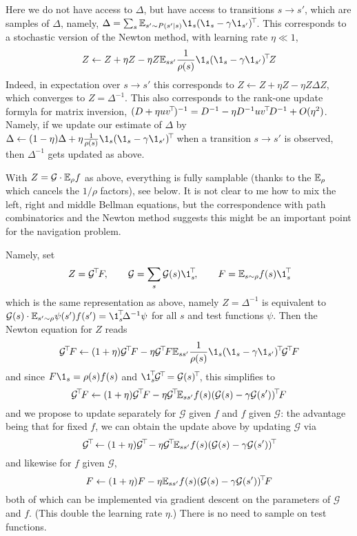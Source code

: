 \documentclass[11pt,a4paper]{article}
\newcommand{\green}{\mathcal{G}}
\begin{document}
Here we do not have access to $\Delta$, but have access to transitions
$s\to s'$, which are samples of
$\Delta$, namely, $\Delta=\sum_s\E_{s'\sim P(s'|s)} \1_s\transp{(\1_s-\gamma
\1_{s'})}$. This corresponds to a stochastic version of the Newton
method, with learning rate $\eta\ll 1$,
\begin{equation}
Z\gets Z+\eta Z-\eta Z \E_{ss'} \frac{1}{\rho(s)}\1_s\transp{(\1_s-\gamma \1_{s'})} Z
\end{equation}
Indeed, in expectation over $s\to s'$ this corresponds to $Z\gets Z+\eta
Z-\eta Z \Delta Z$, which converges to $Z=\Delta^{-1}$. This
also corresponds to the rank-one update formyla for matrix inversion,
$(D+\eta uv^{\!\top}\!)^{-1}=D^{-1}-\eta
D^{-1}uv^{\!\top}\!D^{-1}+O(\eta^2)$. Namely,
if we update our estimate of $\Delta$ by
$\Delta\gets (1-\eta)\Delta+\eta \frac{1}{\rho(s)} \1_s\transp{(\1_s-\gamma
\1_{s'})}$ when a transition $s\to s'$ is observed, then
$\Delta^{-1}$ gets updated as above.

With $Z=\green\cdot \E_{\rho} f$ as above, everything is fully samplable
(thanks to the $\mathbb{E}_\rho$ which cancels the $1/\rho$ factors), see below.
It is not clear to me how to mix the left, right and middle Bellman
equations, but the correspondence with path combinatorics and the Newton
method suggests this
might be an important point for the navigation problem.

Namely, set
\begin{equation}
Z=\transp{\green}F, \qquad \green=\sum_s \green(s)\transp{\1_s},\qquad F=\E_{s\sim
\rho}
f(s)\transp{\1_s}
\end{equation}
which is the same representation as above, namely $Z=\Delta^{-1}$ is
equivalent to $\green(s)\cdot \E_{s'\sim
\rho} \psi(s')f(s')=\transp{\1_s}\Delta^{-1}\psi$ for all $s$ and test
functions $\psi$. Then the Newton equation for $Z$ reads
\begin{equation}
\transp{\green}F\gets (1+\eta)\transp{\green}F-\eta \transp{\green}F \E_{ss'} \frac{1}{\rho(s)}\1_s\transp{(\1_s-\gamma
\1_{s'})} \transp{\green}F
\end{equation}
and since $F\1_s=\rho(s)f(s)$ and
$\transp{\1_s}\transp{\green}=\transp{\green(s)}$, this simplifies to
\begin{equation}
\transp{\green}F\gets (1+\eta)\transp{\green}F-\eta
\transp{\green} \E_{ss'} f(s)\transp{(\green(s)-\gamma
\green(s'))}F
\end{equation}
and we propose to update separately for $\green$ given $f$ and $f$ given
$\green$: the advantage being that for fixed $f$, we can obtain the
update above by updating $\green$ via
\begin{equation}
\transp{\green}\gets (1+\eta)\transp{\green}-\eta
\transp{\green} \E_{ss'} f(s)\transp{(\green(s)-\gamma
\green(s'))}
\end{equation}
and likewise for $f$ given $\green$,
\begin{equation}
F\gets (1+\eta)F-\eta
\E_{ss'} f(s)\transp{(\green(s)-\gamma
\green(s'))}F
\end{equation}
both of which can be implemented via gradient descent on the parameters
of $\green$ and $f$. (This double the learning rate $\eta$.)
There is no need to sample on test functions.
\end{document}
